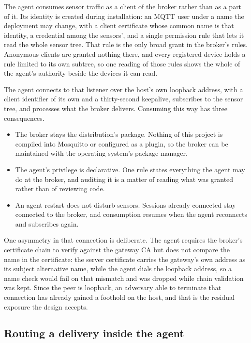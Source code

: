 \documentclass[12pt,a4paper]{report}
\begin{document}
The agent consumes sensor traffic as a client of the broker rather
than as a part of it. Its identity is created during installation:
an MQTT user under a name the deployment may change, with a client
certificate whose common name is that identity, a credential among
the sensors', and a single permission rule that lets it read the
whole sensor tree. That rule is the only broad grant in the broker's
rules. Anonymous clients are granted nothing there, and every
registered device holds a rule limited to its own subtree, so one
reading of those rules shows the whole of the agent's authority
beside the devices it can read.

The agent connects to that listener over the host's own loopback
address, with a client identifier of its own and a thirty-second
keepalive, subscribes to the sensor tree, and processes what the
broker delivers. Consuming this way has three consequences.

\begin{itemize}
    \item The broker stays the distribution's package. Nothing of
    this project is compiled into Mosquitto or configured as a
    plugin, so the broker can be maintained with the operating
    system's package manager.
    \item The agent's privilege is declarative. One rule states
    everything the agent may do at the broker, and auditing it is a
    matter of reading what was granted rather than of reviewing code.
    \item An agent restart does not disturb sensors. Sessions
    already connected stay connected to the broker, and consumption
    resumes when the agent reconnects and subscribes again.
\end{itemize}

One asymmetry in that connection is deliberate. The agent requires
the broker's certificate chain to verify against the gateway CA but
does not compare the name in the certificate: the server certificate
carries the gateway's own address as its subject alternative name,
while the agent dials the loopback address, so a name check would
fail on that mismatch and was dropped while chain validation was
kept. Since the peer is loopback, an adversary able to terminate
that connection has already gained a foothold on the host, and that
is the residual exposure the design accepts.

\subsection{Routing a delivery inside the agent}
\label{sec:gw-routing}
\end{document}
